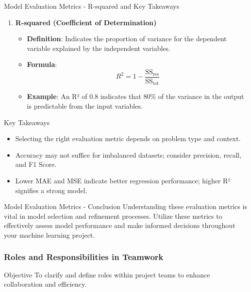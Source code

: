 \documentclass[aspectratio=169]{beamer}
\begin{document}
\begin{frame}[fragile]{Model Evaluation Metrics - R-squared and Key Takeaways}
    \begin{enumerate}
        \item \textbf{R-squared (Coefficient of Determination)}
        \begin{itemize}
            \item \textbf{Definition}: Indicates the proportion of variance for the dependent variable explained by the independent variables.
            \item \textbf{Formula}: 
            \begin{equation}
            R^2 = 1 - \frac{\text{SS}_{\text{res}}}{\text{SS}_{\text{tot}}}
            \end{equation}
            \item \textbf{Example}: An R² of 0.8 indicates that 80\% of the variance in the output is predictable from the input variables.
        \end{itemize}
    \end{enumerate}
    
    \begin{block}{Key Takeaways}
        \begin{itemize}
            \item Selecting the right evaluation metric depends on problem type and context.
            \item Accuracy may not suffice for imbalanced datasets; consider precision, recall, and F1 Score.
            \item Lower MAE and MSE indicate better regression performance; higher R² signifies a strong model.
        \end{itemize}
    \end{block}
\end{frame}

\begin{frame}[fragile]{Model Evaluation Metrics - Conclusion}
    Understanding these evaluation metrics is vital in model selection and refinement processes. Utilize these metrics to effectively assess model performance and make informed decisions throughout your machine learning project.
\end{frame}

\begin{frame}[fragile]
    \frametitle{Roles and Responsibilities in Teamwork}
    \begin{block}{Objective}
        To clarify and define roles within project teams to enhance collaboration and efficiency.
    \end{block}
\end{frame}
\end{document}
